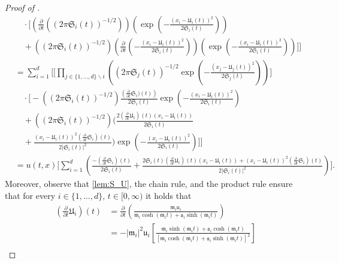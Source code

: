 \begin{proof}[Proof of ]
\begin{equation}
\begin{split}
				&\quad \cdot \bigg[\left( \frac{\partial}{\partial t} \left( (2\pi   \mathfrak{S}_i(t))^{-1/2} \right) \right) \left( \exp \! \left(- \frac{(x_i -\mathfrak{U}_i(t) )^2}{2\mathfrak{S}_i(t)}\right) \right) \\
				&\quad + \left( (2\pi   \mathfrak{S}_i(t))^{-1/2} \right) \left( \frac{\partial}{\partial t}  \left( - \frac{(x_i -\mathfrak{U}_i(t) )^2}{2\mathfrak{S}_i(t)} \right) \right) \left(\exp \! \left(- \frac{(x_i -\mathfrak{U}_i(t) )^2}{2\mathfrak{S}_i(t)}\right) \right)  \bigg] \Bigg] \\
				&=  \sum_{i=1}^d \Bigg[  \bigg[ \prod\nolimits_{ j \in \{ 1, \dots,d \} \backslash i} \left( (2\pi \mathfrak{S}_j(t))^{-1/2} \exp \! \left( - \frac{(x_j -\mathfrak{U}_j(t) )^2}{2\mathfrak{S}_j(t)}\right) \right)\bigg]\\
				&\quad \cdot \bigg[   - \left( (2\pi  \mathfrak{S}_i(t))^{-1/2}\right)\frac{\left( \tfrac{\partial }{\partial t}\mathfrak{S}_i) (t)\right)}{2\mathfrak{S}_i(t)} \exp \! \left(- \frac{(x_i -\mathfrak{U}_i(t) )^2}{2\mathfrak{S}_i(t)}\right) \\
				&\quad + \left( (2\pi  \mathfrak{S}_i(t))^{-1/2}\right) \bigg(  \frac{ 2(\tfrac{\partial }{\partial t}\mathfrak{U}_i)(t)(x_i-\mathfrak{U_i}(t))}{2\mathfrak{S}_i(t)} \\
				&\quad  + \frac{(x_i-\mathfrak{U}_i(t))^2 (\tfrac{\partial }{\partial t}\mathfrak{S}_i)(t)}{2|\mathfrak{S}_i(t)|^{2}} \bigg) \exp \! \left(- \frac{(x_i -\mathfrak{U}_i(t) )^2}{2\mathfrak{S}_i(t)}\right) \bigg] \Bigg] \\
				& = u(t,x) \Bigg[ \sum_{i=1}^d\left( \frac{-(\tfrac{\partial }{\partial t}\mathfrak{S}_i) (t)}{2\mathfrak{S}_i(t)} +
					\frac{ 2\mathfrak{S}_i(t) (\tfrac{\partial }{\partial t}\mathfrak{U}_i)(t)(x_i-\mathfrak{U_i}(t)) + (x_i-\mathfrak{U}_i(t))^2 (\tfrac{\partial }{\partial t}\mathfrak{S}_i)(t)}{2|\mathfrak{S}_i(t)|^{2}}\right) \Bigg].
		\end{split} 
	\end{equation}
	Moreover, observe that \eqref{lem:S_U}, the chain rule, and the product rule ensure that for every
	$i \in \{1, \dots,d\}$,
	$t \in [0,\infty)$
	it holds that
	\begin{equation}
		\begin{aligned}
			(\tfrac{\partial }{\partial t}\mathfrak{U}_i)(t) &= \frac{\partial }{\partial t} \left( \frac{\mathfrak{m}_i \mathfrak{u}_i}{\mathfrak{m}_i \cosh(\mathfrak{m}_i  t) + \mathfrak{s}_i \sinh(\mathfrak{m}_i t)} \right)\\
			&= - |\mathfrak{m}_i|^2 \mathfrak{u}_i \left[ \frac{\mathfrak{m}_i \sinh(\mathfrak{m}_i  t) + \mathfrak{s}_i \cosh(\mathfrak{m}_i t)}{\left[ \mathfrak{m}_i \cosh(\mathfrak{m}_i  t) + \mathfrak{s}_i \sinh(\mathfrak{m}_i t)\right]^2} \right]\\

\end{aligned}
\end{equation}
\end{proof}
